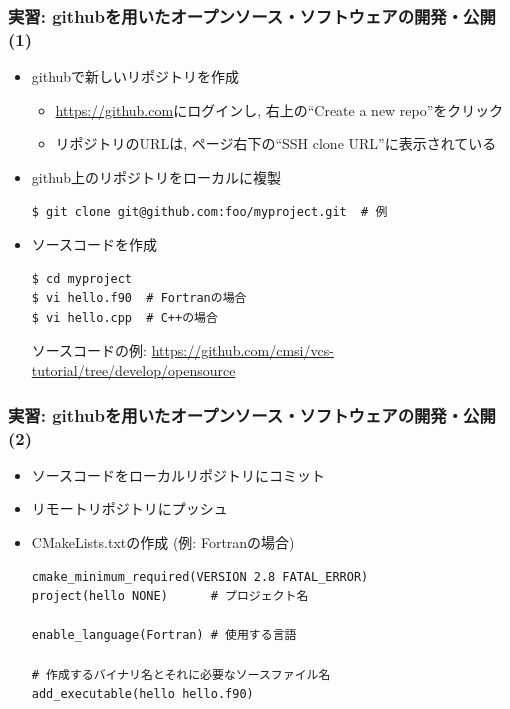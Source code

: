\begin{frame}[t,fragile]
  \frametitle{実習: githubを用いたオープンソース・ソフトウェアの開発・公開(1)}
  \begin{itemize}
  \item githubで新しいリポジトリを作成
    \begin{itemize}
      \item \url{https://github.com}にログインし, 右上の``Create a new repo''をクリック
      \item リポジトリのURLは, ページ右下の``SSH clone URL''に表示されている
    \end{itemize}
  \item github上のリポジトリをローカルに複製
\begin{lstlisting}
$ git clone git@github.com:foo/myproject.git  # 例
\end{lstlisting}
  \item ソースコードを作成
\begin{lstlisting}
$ cd myproject
$ vi hello.f90  # Fortranの場合
$ vi hello.cpp  # C++の場合
\end{lstlisting}
  ソースコードの例: \url{https://github.com/cmsi/vcs-tutorial/tree/develop/opensource}
  \end{itemize}
\end{frame}

\begin{frame}[t,fragile]
  \frametitle{実習: githubを用いたオープンソース・ソフトウェアの開発・公開(2)}
  \begin{itemize}
  \item ソースコードをローカルリポジトリにコミット
  \item リモートリポジトリにプッシュ
  \item CMakeLists.txtの作成 (例: Fortranの場合)
\begin{lstlisting}
cmake_minimum_required(VERSION 2.8 FATAL_ERROR)
project(hello NONE)      # プロジェクト名

enable_language(Fortran) # 使用する言語

# 作成するバイナリ名とそれに必要なソースファイル名
add_executable(hello hello.f90)
\end{lstlisting}
  \end{itemize}
\end{frame}

